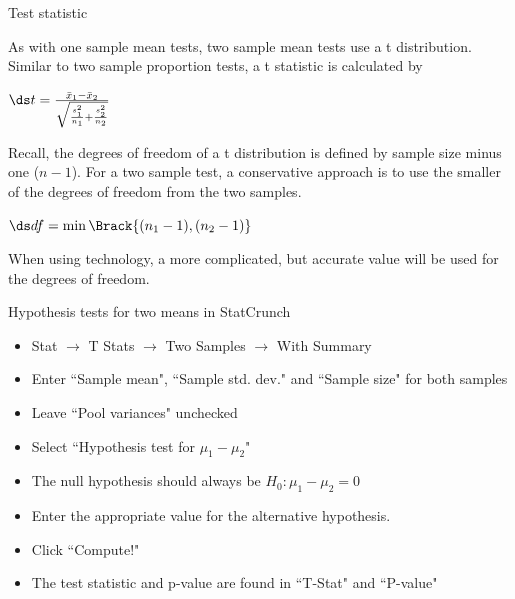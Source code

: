 \documentclass[xcolor=table, handout]{beamer}
\begin{document}
\begin{frame}{Test statistic}
\begin{block}{}
\large
As with one sample mean tests, two sample mean tests use a t distribution. Similar to two sample proportion tests, a t statistic  is calculated by\\
\medskip
{\centering $\ds t = \frac {\bar x_1 - \bar x_2}{\sqrt{\frac{s_1^2}{n_1} + \frac{s_2^2}{n_2}}}$ \par}
\medskip\pause
Recall, the degrees of freedom of a t distribution is defined by sample size minus one ($n-1$). For a two sample test, a conservative approach is to use the smaller of the degrees of freedom from the two samples.\\
\medskip
{\centering $\ds df = \min\Brack{(n_1-1) , (n_2-1)}$ \par}
\pause\medskip
When using technology, a more complicated, but accurate value will be used for the degrees of freedom.
\end{block}
\end{frame}

\begin{frame}{Hypothesis tests for two means in StatCrunch}

\begin{block}{}
\large
\begin{itemize}
\item Stat $\to$ T Stats $\to$ Two Samples $\to$ With Summary
\item Enter ``Sample mean", ``Sample std. dev." and ``Sample size" for both samples
\item Leave ``Pool variances" unchecked
\item Select ``Hypothesis test for $\mu_1 - \mu_2$"
\item The null hypothesis should always be $H_0: \mu_1 - \mu_2 = 0$
\item Enter the appropriate value for the alternative hypothesis.
\item Click ``Compute!"
\item The test statistic and p-value are found in ``T-Stat" and ``P-value"
\end{itemize}
\end{block}

\end{frame}
\end{document}
